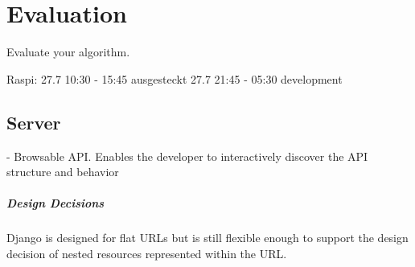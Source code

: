 \chapter{Evaluation}
\label{sec:evaluation}

Evaluate your algorithm.

Raspi: 27.7 10:30 - 15:45 ausgesteckt
27.7 21:45 - 05:30 development

\section{Server}

- Browsable API. Enables the developer to interactively discover the API structure and behavior

\paragraph{Design Decisions}

Django is designed for flat URLs but is still flexible enough to support the design decision of nested resources represented within the URL.